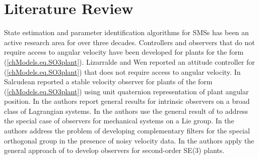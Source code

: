 \section{Literature Review}
\label{chSMS_ID.sec.litReview}

State estimation and parameter identification algorithms for
\acfp{SMS} has been an active research area for
over three decades.  Controllers and observers that do not require
access to angular velocity have been developed for plants for the form
(\ref{chModels.eq.SO3plant}).  Lizarralde and Wen reported an attitude
controller for (\ref{chModels.eq.SO3plant}) that does not require
access to angular velocity\cite{Lizarralde1996}.
%
In \cite{Salcudean1991} Salcudean reported a stable velocity observer
for plants of the form (\ref{chModels.eq.SO3plant}) using unit
quaternion representation of plant angular position.
%
In \cite{Aghannan2003} the authors report general results for
intrinsic observers on a broad class of Lagrangian systems.  In
\cite{Maithripala2004} the authors use the general result of
\cite{Aghannan2003} to address the special case of observers for
mechanical systems on a Lie group.  In \cite{Mahony2005,Mahony2008}
the authors address the problem of developing complementary filters
for the special orthogonal group in the presence of noisy velocity data.
In \cite{Baldwin2009} the authors apply the general approach of
\cite{Mahony2005,Mahony2008} to develop observers
for second-order SE(3) plants.




